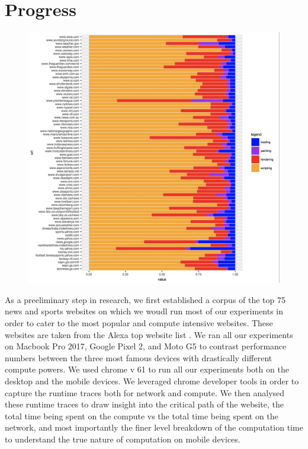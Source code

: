 \section{Progress}
\label{sec:Progress}


\begin{figure}[t!]
\centering
\includegraphics[width=0.9\columnwidth]{figs/cat_p2.png}
\label{fig:act_p2}
\end{figure}

As a preeliminary step in research, we first established a corpus of the top
75 news and sports websites on which we woudl run most of our experiments
in order to cater to the most popular and compute intensive websites. 
These websites are taken from the Alexa top website list \cite{}.
We ran all our experiments on Macbook Pro 2017, Google Pixel 2, and Moto G5
to contrast performance numbers between the three most famous devices with
drastically different compute powers. We used chrome v 61 to run all  our experiments
both on the desktop and the mobile devices. We leveraged chrome developer tools in order
to capture the runtime traces both for network and compute. We then analysed these runtime
traces to draw insight into the critical path of the website, the total time being spent on the 
compute vs the total time being spent on the network, and most importantly the finer
level breakdown of the computation time to understand the true nature of computation on mobile
devices. 

